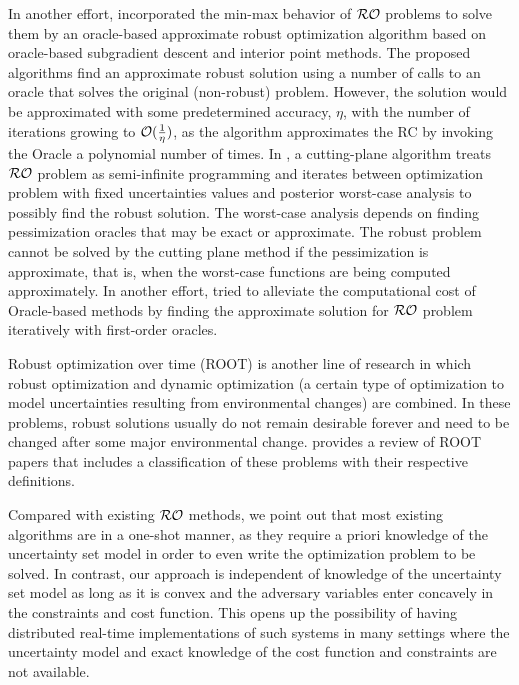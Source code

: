 \documentclass[journal,twoside,web]{ieeecolor}
\begin{document}
In another effort, \cite{bental2015} incorporated the min-max behavior of ${\cal RO}$ problems to solve them by an oracle-based approximate robust optimization algorithm based on oracle-based subgradient descent and interior point methods. The proposed algorithms find an approximate robust solution using a number of calls to an oracle that solves the original (non-robust) problem. However, the solution would be approximated with some predetermined accuracy, $\eta$, with the number of iterations growing to ${\cal O}(\frac{1}{\eta})$, as the algorithm approximates the RC by invoking the Oracle a polynomial number of times.
In \cite{mutapcic2009}, a cutting-plane algorithm treats ${\cal RO}$ problem as semi-infinite programming and iterates between optimization problem with fixed uncertainties values and posterior worst-case analysis to possibly find the robust solution. 
The worst-case analysis depends on finding pessimization oracles that may be exact or approximate. The robust problem cannot be solved by the cutting plane method if the pessimization is approximate, that is, when the worst-case functions are being computed approximately. In another effort, \cite{nguyen2018} tried to alleviate the computational cost of Oracle-based methods by finding the approximate solution for ${\cal RO}$ problem iteratively with first-order oracles.

Robust optimization over time (ROOT) is another line of research in which robust optimization and dynamic optimization (a certain type of optimization to model uncertainties resulting from environmental changes) are combined. In these problems, robust solutions usually do not remain desirable forever and need to be changed after some major environmental change. \cite{yazdani2023} provides a review of ROOT papers that includes a classification of these problems with their respective definitions.

Compared with existing ${\cal RO}$ methods, we point out that most existing algorithms are in a one-shot manner, as they require a priori knowledge of the uncertainty set model in order to even write the optimization problem to be solved. In contrast, our approach is independent of knowledge of the uncertainty set model as long as it is convex and the adversary variables enter concavely in the constraints and cost function. This opens up the possibility of having distributed real-time implementations of such systems in many settings where the uncertainty model and exact knowledge of the cost function and constraints are not available.
\end{document}
